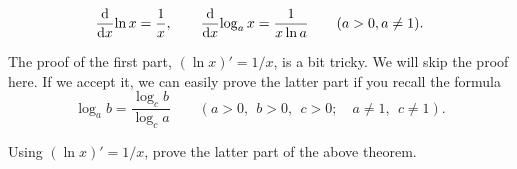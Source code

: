 \documentclass[11pt,pdfa,lastpage]{MishoNote}
\newcommand\starskip{\bigskip\begin{center}\pgfornament[width=7cm]{88}\end{center}\medskip}
\begin{document}
\begin{theorem}{}{}
  \begin{equation}
      \diff{}x{\ln x}=\frac{1}{x},\qquad
      \diff{}x{\log_a x}=\frac{1}{x\ln a}\qquad(a>0,a\neq 1).
  \end{equation}
\end{theorem}
The proof of the first part, $(\ln x)'=1/x$, is a bit tricky. We will skip the proof here.
If we accept it, we can easily prove the latter part if you recall the formula
 \[\log_a b = \frac{\log_c b}{\log_c a}
 \qquad(a>0,~~b>0,~~c>0;\quad a\neq 1,~~c\neq 1).
 \]

\starskip

\begin{enumerate}[resume]
  \itemA Using $(\ln x)'=1/x$, prove the latter part of the above theorem.\\
\end{enumerate}
\end{document}
